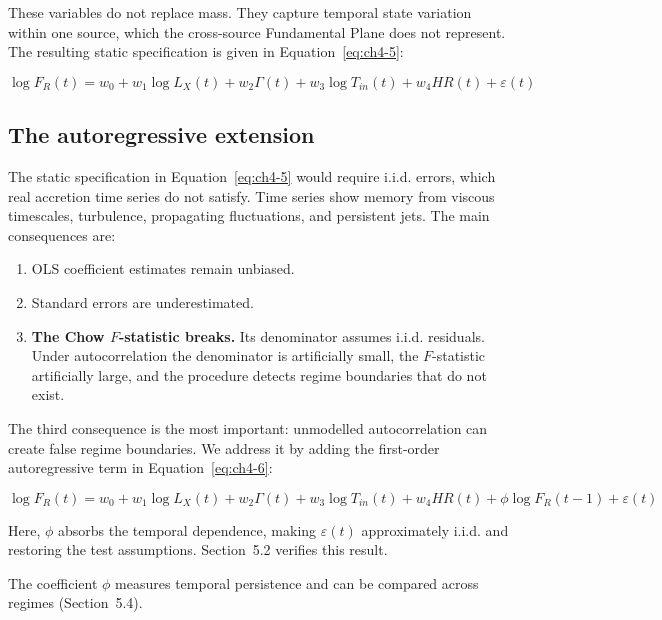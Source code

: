 These variables do not replace mass. They capture temporal state variation within one
source, which the cross-source Fundamental Plane does not represent. The resulting
static specification is given in Equation~\eqref{eq:ch4-5}:

\begin{equation}
    \label{eq:ch4-5}
\log F_R(t) = w_0 + w_1 \log L_X(t) + w_2 \Gamma(t) + w_3 \log T_{in}(t) + w_4 HR(t) + \varepsilon(t)
\end{equation}


\subsection{The autoregressive extension}

The static specification in Equation~\eqref{eq:ch4-5} would require i.i.d. errors,
which real accretion time series do not satisfy. Time series show memory from viscous
timescales, turbulence, propagating
fluctuations, and persistent jets. The main consequences are:

\begin{enumerate}
    \item OLS coefficient estimates remain unbiased.
    \item Standard errors are underestimated.
    \item \textbf{The Chow $F$-statistic breaks.} Its denominator assumes i.i.d. residuals. Under
autocorrelation the denominator is artificially small, the $F$-statistic
artificially large, and the procedure detects regime boundaries that do not exist.
\end{enumerate}

The third consequence is the most important: unmodelled autocorrelation can create
false regime boundaries. We address it by adding the first-order autoregressive term
in Equation~\eqref{eq:ch4-6}:

\begin{equation}
    \label{eq:ch4-6}
\log F_R(t) = w_0 + w_1 \log L_X(t) + w_2 \Gamma(t) + w_3 \log T_{in}(t) + w_4 HR(t) + \phi \log F_R(t-1) + \varepsilon(t)
\end{equation}

Here, $\phi$ absorbs the temporal dependence, making $\varepsilon(t)$ approximately
i.i.d. and restoring the test assumptions. Section~5.2 verifies this result.

The coefficient $\phi$ measures temporal persistence and can be compared across
regimes (Section~5.4).

